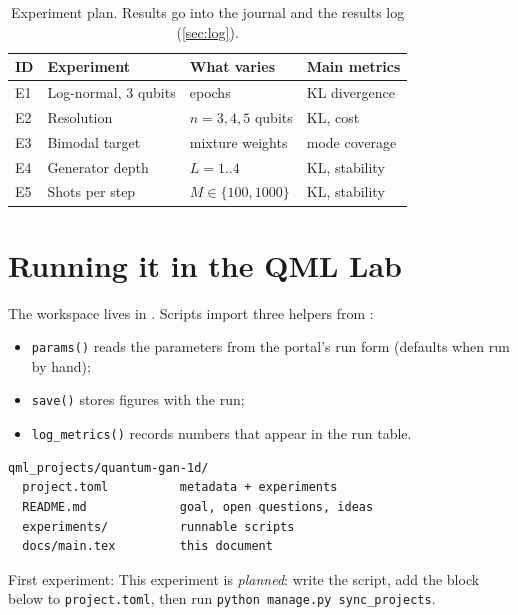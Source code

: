 \documentclass[11pt,a4paper]{article}
\begin{document}
\begin{table}[h]
\centering\small
\begin{tabularx}{\linewidth}{@{}l>{\raggedright}X>{\raggedright}X>{\raggedright\arraybackslash}X@{}}
\toprule
ID & Experiment & What varies & Main metrics \\
\midrule
  E1 & Log-normal, 3 qubits & epochs & KL divergence \\
  E2 & Resolution & $n=3,4,5$ qubits & KL, cost \\
  E3 & Bimodal target & mixture weights & mode coverage \\
  E4 & Generator depth & $L=1..4$ & KL, stability \\
  E5 & Shots per step & $M\in\{100,1000\}$ & KL, stability \\
\bottomrule
\end{tabularx}
\caption{Experiment plan. Results go into the journal and the results log (\cref{sec:log}).}
\end{table}

\section{Running it in the QML Lab}
The workspace lives in . Scripts import three helpers from
:
\begin{itemize}
  \item \texttt{params()} reads the parameters from the portal's run form (defaults when run by hand);
  \item \texttt{save()} stores figures with the run;
  \item \texttt{log\_metrics()} records numbers that appear in the run table.
\end{itemize}

\begin{lstlisting}
qml_projects/quantum-gan-1d/
  project.toml          metadata + experiments
  README.md             goal, open questions, ideas
  experiments/          runnable scripts
  docs/main.tex         this document
\end{lstlisting}

First experiment: This experiment is \emph{planned}: write the script, add the block below to \texttt{project.toml}, then run \texttt{python manage.py sync\_projects}.
\end{document}
